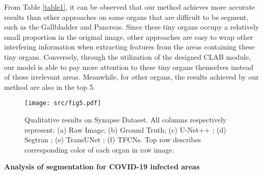 \documentclass[runningheads]{llncs}
\begin{document}
From Table \ref{table1}, it can be observed that our method achieves more accurate results than other approaches on some organs that are difficult to be segment, such as the Gallbladder and Pancreas. Since these tiny organs occupy a relatively small proportion in the original image, other approaches are easy to wrap other interfering information when extracting features from the areas containing these tiny organs. Conversely, through the utilization of the designed CLAB module, our model is able to pay more attention to these tiny organs themselves instead of those irrelevant areas. Meanwhile, for other organs, the results achieved by our method are also in the top 5.


\begin{figure}[H]
\centerline{\texttt{[image: src/fig5.pdf]}}
\caption{Qualitative results on Synapse Dataset. All columns respectively represent: (a) Raw Image; (b) Ground Truth; (c) U-Net++ \cite{zhou2018unet++}; (d) Segtran \cite{zheng2021rethinking}; (e) TransUNet \cite{chen2021transunet}; (f) TFCNs. Top row describes corresponding color of each organ in raw image.}
\label{fig3}
\end{figure}
\noindent\textbf{Analysis of segmentation for COVID-19 infected areas}\par
\end{document}
